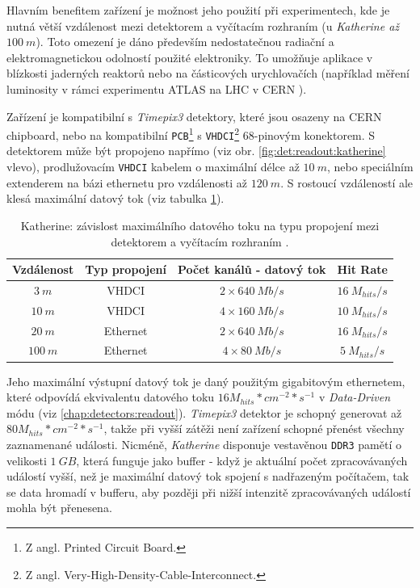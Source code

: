 Hlavním benefitem zařízení je možnost jeho použití při experimentech, kde je nutná větší vzdálenost mezi detektorem a vyčítacím rozhraním (u \textit{Katherine až $100~m$}). Toto omezení je dáno především nedostatečnou radiační a elektromagnetickou odolností použité elektroniky. To umožňuje aplikace v blízkosti jaderných reaktorů nebo na částicových urychlovačích (například měření luminosity v rámci experimentu ATLAS na LHC v CERN \cite{atlastpx_luminosity}). 

Zařízení je kompatibilní s \textit{Timepix3} detektory, které jsou osazeny na CERN chipboard, nebo na kompatibilní \texttt{PCB}\footnote{Z angl. Printed Circuit Board.} s \texttt{VHDCI}\footnote{Z angl. Very-High-Density-Cable-Interconnect.} 68-pinovým konektorem. S detektorem může být propojeno napřímo (viz obr. \ref{fig:det:readout:katherine} vlevo), prodlužovacím \texttt{VHDCI} kabelem o maximální délce až $10~m$, nebo speciálním extenderem na bázi ethernetu pro vzdálenosti až $120~m$. S rostoucí vzdáleností ale klesá maximální datový tok (viz tabulka \ref{tab:det:katherine:data_flow}).

\begin{table}[th]
	\begin{center}
		\begin{tabular}{|c|c|c|c|}
			\hline
			\textbf{Vzdálenost} & \textbf{Typ propojení} & \textbf{Počet kanálů - datový tok} & \textbf{Hit Rate} \\
			\hline
			$3~m$ & VHDCI & $2 \times 640~Mb/s$ & $16~M_{hits}/s$\\
			$10~m$ & VHDCI & $4 \times 160~Mb/s$ & $10~M_{hits}/s$\\
			$20~m$ & Ethernet & $2 \times 640~Mb/s$ & $16~M_{hits}/s$\\
			$100~m$ & Ethernet & $4 \times 80~Mb/s$ & $5~M_{hits}/s$\\
			\hline
		\end{tabular}
	\end{center}
	\caption{Katherine: závislost maximálního datového toku na typu propojení mezi detektorem a vyčítacím rozhraním \cite{Katherine}.}
	\label{tab:det:katherine:data_flow}
\end{table}

Jeho maximální výstupní datový tok je daný použitým gigabitovým ethernetem, které odpovídá ekvivalentu datového toku $16M_{hits}*cm^{-2}*s^{-1}$ v \textit{Data-Driven} módu (viz \ref{chap:detectors:readout}). \textit{Timepix3} detektor je schopný generovat až $80M_{hits}*cm^{-2}*s^{-1}$, takže při vyšší zátěži není zařízení schopné přenést všechny zaznamenané události. Nicméně, \textit{Katherine} disponuje vestavěnou \texttt{DDR3} pamětí o velikosti $1~GB$, která funguje jako buffer - když je aktuální počet zpracovávaných událostí vyšší, než je maximální datový tok spojení s nadřazeným počítačem, tak se data hromadí v bufferu, aby později při nižší intenzitě zpracovávaných událostí mohla být přenesena.

